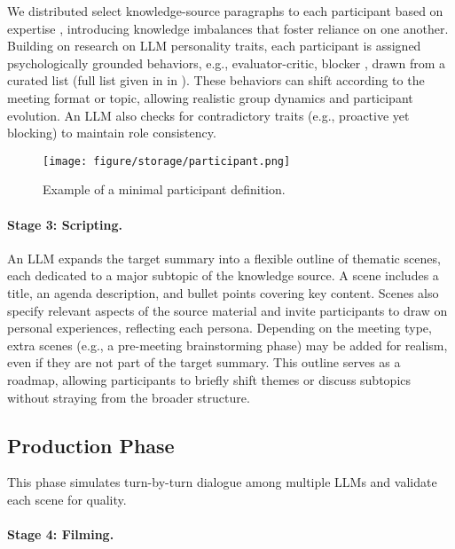 We distributed select knowledge-source paragraphs to each participant based on expertise \cite{LiWXG25}, introducing knowledge imbalances that foster reliance on one another.
Building on \citet{SerapioGarciaSCS23a} research on LLM personality traits, each participant is assigned psychologically grounded behaviors, e.g., evaluator-critic, blocker \cite{BenneS48}, drawn from a curated list (full list given in  in ).
These behaviors can shift according to the meeting format or topic, allowing realistic group dynamics and participant evolution.  %
An LLM also checks for contradictory traits (e.g., proactive yet blocking) to maintain role consistency.


\begin{figure}[t]
    \centering
    \texttt{[image: figure/storage/participant.png]}
    \caption{Example of a minimal participant definition.}
    \label{fig:participant_figure}
\end{figure}



\paragraph{Stage 3: Scripting.}
An LLM expands the target summary into a flexible outline of thematic scenes, each dedicated to a major subtopic of the knowledge source.
A scene includes a title, an agenda description, and bullet points covering key content.
Scenes also specify relevant aspects of the source material and invite participants to draw on personal experiences, reflecting each persona.
Depending on the meeting type, extra scenes (e.g., a pre-meeting brainstorming phase) may be added for realism, even if they are not part of the target summary.
This outline serves as a roadmap, allowing participants to briefly shift themes or discuss subtopics without straying from the broader structure.

\subsection{Production Phase}
This phase simulates turn-by-turn dialogue among multiple LLMs and validate each scene for quality.


\paragraph{Stage 4: Filming.}
\label{sec:stage_4_filming}

